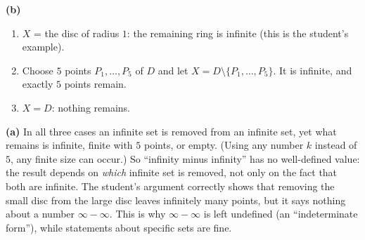 \textbf{(b)}
\begin{enumerate}
\item[(i)] $X$ = the disc of radius $1$: the remaining ring is infinite (this is the student's example).
\item[(ii)] Choose $5$ points $P_1,\dots,P_5$ of $D$ and let $X=D\setminus\{P_1,\dots,P_5\}$. It is infinite, and exactly $5$ points remain.
\item[(iii)] $X=D$: nothing remains.
\end{enumerate}

\textbf{(a)} In all three cases an infinite set is removed from an infinite set, yet what remains is infinite, finite with $5$ points, or empty. (Using any number $k$ instead of $5$, any finite size can occur.) So ``infinity minus infinity'' has no well-defined value: the result depends on \emph{which} infinite set is removed, not only on the fact that both are infinite. The student's argument correctly shows that removing the small disc from the large disc leaves infinitely many points, but it says nothing about a number $\infty-\infty$. This is why $\infty-\infty$ is left undefined (an ``indeterminate form''), while statements about specific sets are fine.
